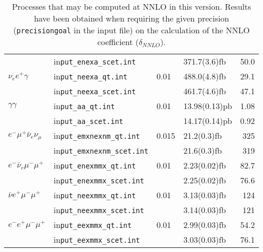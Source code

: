 \begin{table}
\begin{tabular}{llllr}
& in\texttt{put\_enexa\_scet.int} &      & 371.7(3.6)fb & 50.0 \\[2pt] %
$\nu_e e^+\gamma$
& in\texttt{put\_neexa\_qt.int}   & 0.01 & 488.0(4.8)fb & 29.1 \\ %
& in\texttt{put\_neexa\_scet.int} &      & 461.7(4.6)fb & 47.1 \\[2pt] %
$\gamma\gamma$
& in\texttt{put\_aa\_qt.int}   & 0.01 & 13.98(0.13)pb & 1.08 \\ %
& in\texttt{put\_aa\_scet.int} &      & 14.17(0.14)pb & 0.92 \\[2pt] %
$e^-\mu^+\bar\nu_e\nu_\mu$
& in\texttt{put\_emxnexnm\_qt.int}   & 0.015 & 21.2(0.3)fb  & 325 \\ %
& in\texttt{put\_emxnexnm\_scet.int} &       & 21.6(0.3)fb  & 319 \\[2pt] %
$e^- \bar\nu_e \mu^-\mu^+$
& in\texttt{put\_enexmmx\_qt.int}   & 0.01   & 2.23(0.02)fb & 82.7 \\ %
& in\texttt{put\_enexmmx\_scet.int} &        & 2.25(0.02)fb & 76.6 \\[2pt] %
$\bar\nu e^+ \mu^- \mu^+$
& in\texttt{put\_neexmmx\_qt.int}   & 0.01   & 3.13(0.03)fb & 124 \\ %
& in\texttt{put\_neexmmx\_scet.int} &        & 3.14(0.03)fb & 121 \\[2pt] %
$e^- e^+ \mu^- \mu^+$
& in\texttt{put\_eexmmx\_qt.int}   & 0.01    & 2.99(0.03)fb & 54.2 \\ %
& in\texttt{put\_eexmmx\_scet.int} &         & 3.03(0.03)fb & 76.1 \\ %
\bottomrule
\end{tabular}
\caption{Processes that may be computed at NNLO in this version.  Results have been obtained
when requiring the given precision (\texttt{precisiongoal} in the input file)
on the calculation of the NNLO coefficient ($\delta_{NNLO}$).
\label{table:nnlo10}}
\end{table}
\renewcommand{\arraystretch}{1.0}


